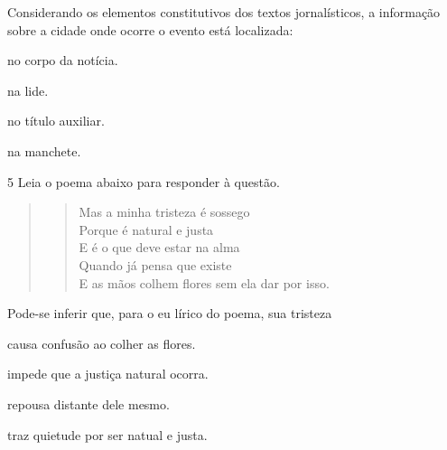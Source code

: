 
Considerando os elementos constitutivos dos textos jornalísticos, a
informação sobre a cidade onde ocorre o evento está localizada:

\begin{multicols}{2}
\begin{escolha}
  
  \item no corpo da notícia.
  
  \item na lide.
  
  \item no título auxiliar.
  
  \item na manchete.

\end{escolha}
\end{multicols}

\num{5} Leia o poema abaixo para responder à questão. 

\begin{quote}
\begin{verse}

Mas a minha tristeza é sossego \\
Porque é natural e justa \\
E é o que deve estar na alma \\
Quando já pensa que existe \\
E as mãos colhem flores sem ela dar por isso.

\end{verse}
\end{quote}


Pode-se inferir que, para o eu lírico do poema, sua tristeza

\begin{escolha}

    \item causa confusão ao colher as flores.

    \item impede que a justiça natural ocorra.

    \item repousa distante dele mesmo. 

    \item traz quietude por ser natual e justa. 

\end{escolha}

